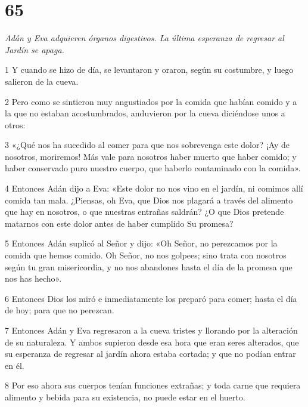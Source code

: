 \chapter{65}

\par \textit{Adán y Eva adquieren órganos digestivos. La última esperanza de regresar al Jardín se apaga.}

\par 1 Y cuando se hizo de día, se levantaron y oraron, según su costumbre, y luego salieron de la cueva.

\par 2 Pero como se sintieron muy angustiados por la comida que habían comido y a la que no estaban acostumbrados, anduvieron por la cueva diciéndose unos a otros:

\par 3 «¿Qué nos ha sucedido al comer para que nos sobrevenga este dolor? ¡Ay de nosotros, moriremos! Más vale para nosotros haber muerto que haber comido; y haber conservado puro nuestro cuerpo, que haberlo contaminado con la comida».

\par 4 Entonces Adán dijo a Eva: «Este dolor no nos vino en el jardín, ni comimos allí comida tan mala. ¿Piensas, oh Eva, que Dios nos plagará a través del alimento que hay en nosotros, o que nuestras entrañas saldrán? ¿O que Dios pretende matarnos con este dolor antes de haber cumplido Su promesa?

\par 5 Entonces Adán suplicó al Señor y dijo: «Oh Señor, no perezcamos por la comida que hemos comido. Oh Señor, no nos golpees; sino trata con nosotros según tu gran misericordia, y no nos abandones hasta el día de la promesa que nos has hecho».

\par 6 Entonces Dios los miró e inmediatamente los preparó para comer; hasta el día de hoy; para que no perezcan.

\par 7 Entonces Adán y Eva regresaron a la cueva tristes y llorando por la alteración de su naturaleza. Y ambos supieron desde esa hora que eran seres alterados, que su esperanza de regresar al jardín ahora estaba cortada; y que no podían entrar en él.

\par 8 Por eso ahora sus cuerpos tenían funciones extrañas; y toda carne que requiera alimento y bebida para su existencia, no puede estar en el huerto.

